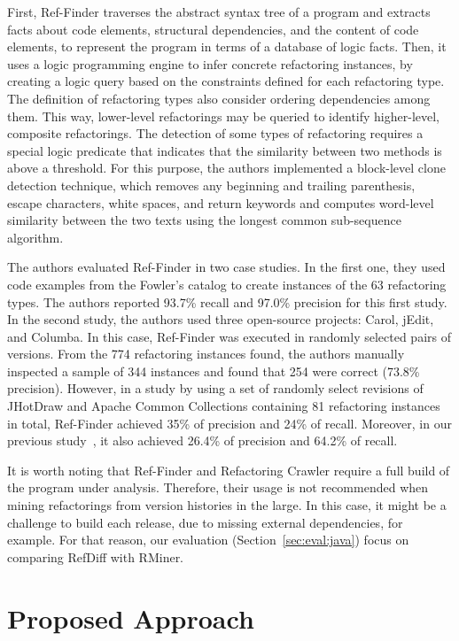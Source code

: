 First, Ref-Finder traverses the abstract syntax tree of a program and extracts facts about code elements, structural dependencies, and the content of code elements, to represent the program in terms of a database of logic facts. Then, it uses a logic programming engine to infer concrete refactoring instances, by creating a logic query based on the constraints defined for each refactoring type.
The definition of refactoring types also consider ordering dependencies among them. This way, lower-level refactorings may be queried to identify higher-level, composite refactorings.
The detection of some types of refactoring requires a special logic predicate that indicates that the similarity between two methods is above a threshold. For this purpose, the authors implemented a block-level clone detection technique, which removes any beginning and trailing parenthesis, escape characters, white spaces, and return keywords and computes word-level similarity between the two texts using the longest common sub-sequence algorithm.

The authors evaluated Ref-Finder in two case studies.
In the first one, they used code examples from the Fowler's catalog to create instances of the 63 refactoring types. The authors reported 93.7\% recall and 97.0\% precision for this first study.
In the second study, the authors used three open-source projects: Carol, jEdit, and Columba. In this case, Ref-Finder was executed in randomly selected pairs of versions. From the 774 refactoring instances found, the authors manually inspected a sample of 344 instances and found that 254 were correct (73.8\% precision).
However, in a study by \cite{Soares:2013} using a set of randomly select revisions of JHotDraw and Apache Common Collections containing 81 refactoring instances in total, Ref-Finder achieved 35\% of precision and 24\% of recall.
Moreover, in our previous study~\citep{msr2017}, it also achieved 26.4\% of precision and 64.2\% of recall.

It is worth noting that Ref-Finder and Refactoring Crawler require a full build of the program under analysis.
Therefore, their usage is not recommended when mining refactorings from version histories in the large.
In this case, it might be a challenge to build each release, due to missing external dependencies, for example.
For that reason, our evaluation (Section~\ref{sec:eval:java}) focus on comparing RefDiff with RMiner.




\section{Proposed Approach}
\label{SecApproach}

